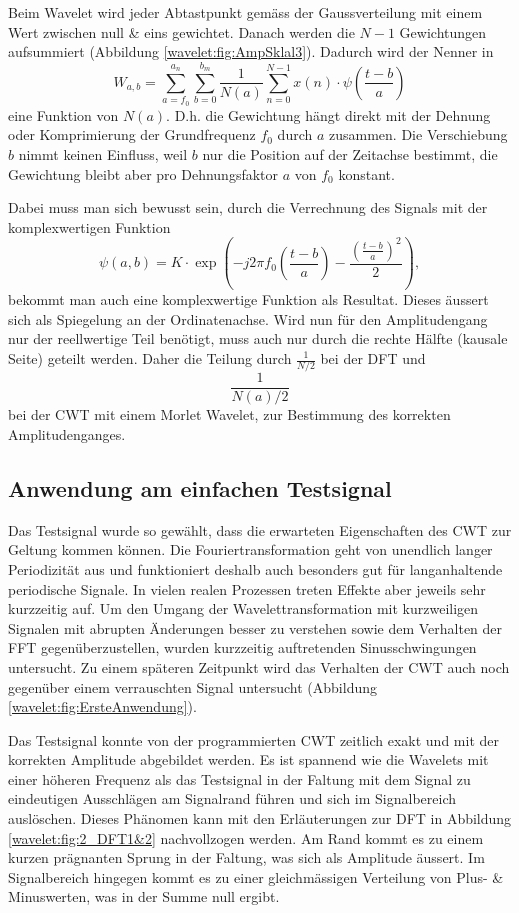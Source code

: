 Beim Wavelet wird jeder Abtastpunkt gemäss der Gaussverteilung mit einem Wert zwischen null \& eins gewichtet. Danach werden die $N-1$ Gewichtungen aufsummiert (Abbildung \ref{wavelet:fig:AmpSklal3}). Dadurch wird der Nenner in \[W_{a,b}=\sum_{a=f_0}^{a_n}\sum_{b=0}^{b_m}\frac{1}{N(a)}\sum_{n=0}^{N-1} x(n)\cdot\psi\left(\frac{t-b}{a}\right)\] eine Funktion von $N(a)$. D.h. die Gewichtung hängt direkt mit der Dehnung oder Komprimierung der Grundfrequenz $f_0$ durch $a$ zusammen. Die Verschiebung $b$ nimmt keinen Einfluss, weil $b$ nur die Position auf der Zeitachse bestimmt, die Gewichtung bleibt aber pro Dehnungsfaktor $a$ von $f_0$ konstant.

Dabei muss man sich bewusst sein, durch die Verrechnung des Signals mit der komplexwertigen Funktion \[\psi(a,b)=K\cdot\exp\left(-j2\pi f_0\left(\frac{t-b}{a}\right)-\frac{\left(\frac{t-b}{a}\right)^2}{2}\right),\] bekommt man auch eine komplexwertige Funktion als Resultat. Dieses äussert sich als Spiegelung an der Ordinatenachse. Wird nun für den Amplitudengang nur der reellwertige Teil benötigt, muss auch nur durch die rechte Hälfte (kausale Seite) geteilt werden. Daher die Teilung durch $\frac{1}{N/2}$ bei der DFT und \[\frac{1}{N(a)/2}\] bei der CWT mit einem Morlet Wavelet, zur Bestimmung des korrekten Amplitudenganges.

\subsection{Anwendung am einfachen Testsignal
	\label{wavelets:subsection:ErsteAnwendung}}
Das Testsignal wurde so gewählt, dass die erwarteten Eigenschaften des CWT zur Geltung kommen können. Die Fouriertransformation geht von unendlich langer Periodizität aus und funktioniert deshalb auch besonders gut für langanhaltende periodische Signale. In vielen realen Prozessen treten Effekte aber jeweils sehr kurzzeitig auf. Um den Umgang der Wavelettransformation mit kurzweiligen Signalen mit abrupten Änderungen besser zu verstehen sowie dem Verhalten der FFT gegenüberzustellen, wurden kurzzeitig auftretenden Sinusschwingungen untersucht. Zu einem späteren Zeitpunkt wird das Verhalten der CWT auch noch gegenüber einem verrauschten Signal untersucht (Abbildung \ref{wavelet:fig:ErsteAnwendung}).

Das Testsignal konnte von der programmierten CWT zeitlich exakt und mit der korrekten Amplitude abgebildet werden. Es ist spannend wie die Wavelets mit einer höheren Frequenz als das Testsignal in der Faltung mit dem Signal zu eindeutigen Ausschlägen am Signalrand führen und sich im Signalbereich auslöschen. Dieses Phänomen kann mit den Erläuterungen zur DFT in Abbildung \ref{wavelet:fig:2_DFT1&2} nachvollzogen werden.
Am Rand kommt es zu einem kurzen prägnanten Sprung in der Faltung, was sich als Amplitude äussert. Im Signalbereich hingegen kommt es zu einer gleichmässigen Verteilung von Plus- \& Minuswerten, was in der Summe null ergibt.

